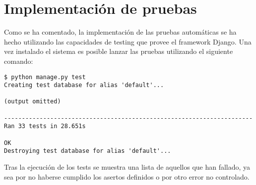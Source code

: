 \section{Implementación de pruebas}

Como se ha comentado, la implementación de las pruebas automáticas se ha hecho
utilizando las capacidades de testing que provee el framework Django. Una vez
instalado el sistema es posible lanzar las pruebas utilizando el siguiente comando:

\begin{verbatim}
$ python manage.py test
Creating test database for alias 'default'...

(output omitted)

----------------------------------------------------------------------
Ran 33 tests in 28.651s

OK
Destroying test database for alias 'default'...
\end{verbatim} 

Tras la ejecución de los tests se muestra una lista de aquellos que han fallado,
ya sea por no haberse cumplido los asertos definidos o por otro error no
controlado. 



